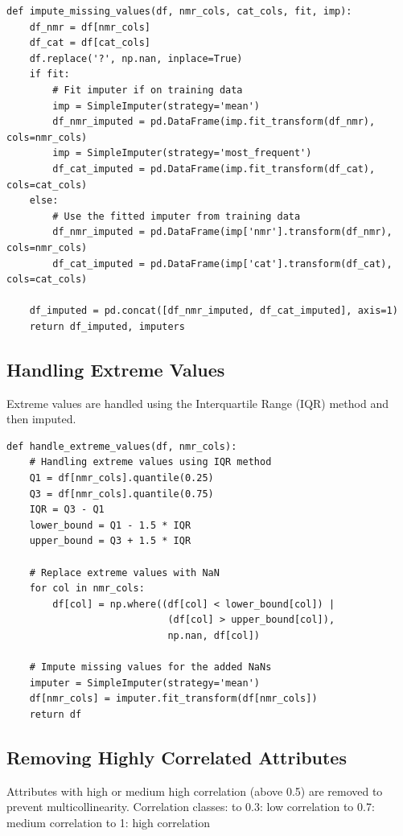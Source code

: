 \documentclass[a4paper,12pt]{article}
\begin{document}
\begin{verbatim}
def impute_missing_values(df, nmr_cols, cat_cols, fit, imp):
    df_nmr = df[nmr_cols]
    df_cat = df[cat_cols]
    df.replace('?', np.nan, inplace=True)
    if fit:
        # Fit imputer if on training data
        imp = SimpleImputer(strategy='mean')
        df_nmr_imputed = pd.DataFrame(imp.fit_transform(df_nmr), cols=nmr_cols)
        imp = SimpleImputer(strategy='most_frequent')
        df_cat_imputed = pd.DataFrame(imp.fit_transform(df_cat), cols=cat_cols)
    else:
        # Use the fitted imputer from training data 
        df_nmr_imputed = pd.DataFrame(imp['nmr'].transform(df_nmr), cols=nmr_cols)
        df_cat_imputed = pd.DataFrame(imp['cat'].transform(df_cat), cols=cat_cols)

    df_imputed = pd.concat([df_nmr_imputed, df_cat_imputed], axis=1)
    return df_imputed, imputers
\end{verbatim}

\newpage
\subsection{Handling Extreme Values}
Extreme values are handled using the Interquartile Range (IQR) method and then imputed.

\begin{verbatim}
def handle_extreme_values(df, nmr_cols):
    # Handling extreme values using IQR method
    Q1 = df[nmr_cols].quantile(0.25)
    Q3 = df[nmr_cols].quantile(0.75)
    IQR = Q3 - Q1
    lower_bound = Q1 - 1.5 * IQR
    upper_bound = Q3 + 1.5 * IQR

    # Replace extreme values with NaN
    for col in nmr_cols:
        df[col] = np.where((df[col] < lower_bound[col]) | 
                            (df[col] > upper_bound[col]), 
                            np.nan, df[col])
    
    # Impute missing values for the added NaNs
    imputer = SimpleImputer(strategy='mean')
    df[nmr_cols] = imputer.fit_transform(df[nmr_cols])
    return df
\end{verbatim}

\subsection{Removing Highly Correlated Attributes}
Attributes with high or medium high correlation (above 0.5) are removed to prevent multicollinearity.
Correlation classes:
 to 0.3: low correlation
 to 0.7: medium correlation
 to 1: high correlation
\newline
\end{document}
